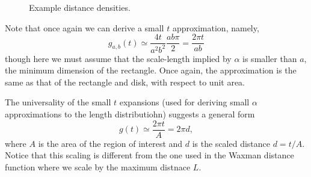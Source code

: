 \documentclass{article}
\begin{document}
\begin{figure}[tbp]
  \begin{center}
    \caption{Example distance densities.}
  \end{center} 
\vspace{-4mm}
\end{figure}



Note that once again we can derive a small $t$ approximation,
namely, 
\[ g_{a,b}(t) \simeq \frac{4 t}{a^2 b^2} \frac{ab \pi}{2}
            = \frac{2 \pi t}{a b} \]
though here we must assume that the scale-length implied by $\alpha$
is smaller than $a$, the minimum dimension of the rectangle.  Once
again, the approximation is the same as that of the rectangle and
disk, with respect to unit area.




The universality of the small $t$ expansions (used for deriving small
$\alpha$ approximations to the length distributiohn) suggests a
general form
\[ g(t) \simeq \frac{2 \pi t}{A} = 2 \pi d, \]
where $A$ is the area of the region of interest and $d$ is the scaled
distance $d = t/A$. Notice that this scaling is different from the one
used in the Waxman distance function where we scale by the maximum
distnace $L$. 
\end{document}
